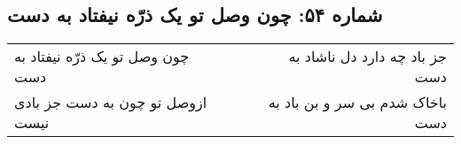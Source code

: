 \begin{center}
\section*{شماره ۵۴: چون وصل تو یک ذرّه نیفتاد به دست}
\label{sec:054}
\begin{longtable}{l p{0.5cm} r}
چون وصل تو یک ذرّه نیفتاد به دست
&&
جز باد چه دارد دل ناشاد به دست
\\
ازوصل تو چون به دست جز بادی نیست
&&
باخاک شدم بی سر و بن باد به دست
\\
\end{longtable}
\end{center}
